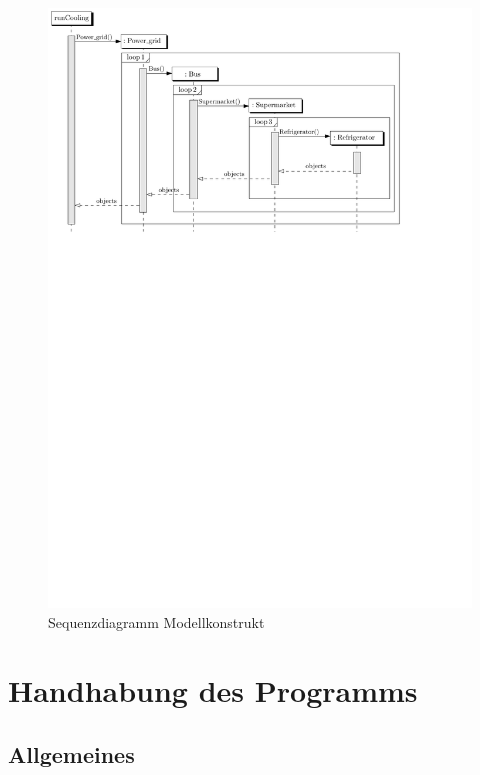 \begin{figure}[h]
\caption{Sequenzdiagramm Modellkonstrukt}
	\label{uml_sequence}
	\begin{center}
	\includegraphics[scale=0.8]{images/Theorie_Super/sequence_one}
	\end{center}
\end{figure}

\section{Handhabung des Programms}
\label{sc:handhabung}

\subsection{Allgemeines}

